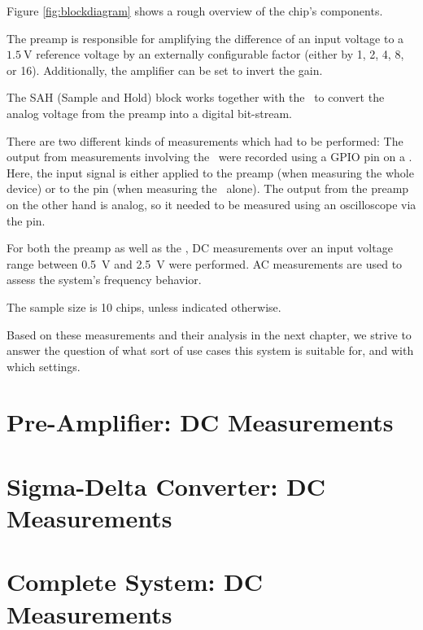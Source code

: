 Figure \ref{fig:blockdiagram} shows a rough overview of the chip's components.

The preamp is responsible for amplifying the difference of an input voltage to
a  $\SI{1.5}{\volt}$ reference voltage by an  externally  configurable  factor
(either  by  1,  2,  4,  8,  or 16). Additionally, the amplifier can be set to
invert the gain.

The SAH  (Sample and Hold) block  works together with the  \sdm~to convert the
analog voltage from the preamp into a digital bit-stream.

There are two different  kinds  of measurements which had to be performed: The
output from measurements involving the \sdm~were recorded using  a GPIO pin on
a  \raspi.  Here,  the  input  signal  is  either  applied to the preamp (when
measuring the whole  device)  or  to the  pin (when measuring
the \sdm~alone). The output from the preamp on the other hand is analog, so it
needed to  be  measured  using  an oscilloscope via the  pin.

For both the preamp as well as the \sdm, DC measurements over an input voltage
range   between   \SI{0.5}{\volt}  and  \SI{2.5}{\volt}  were  performed.   AC
measurements  are  used   to   assess   the   system's   frequency   behavior.

The sample size is 10 chips, unless indicated otherwise.

Based on these  measurements and their analysis in the next chapter, we strive
to answer the question of what sort of use cases this system  is suitable for,
and with which settings.



\section{Pre-Amplifier: DC Measurements}
\label{sec:preAmpDC}



\section{Sigma-Delta Converter: DC Measurements}
\label{sec:sigdelDC}

\section{Complete System: DC Measurements}
\label{sec:systemDC}

